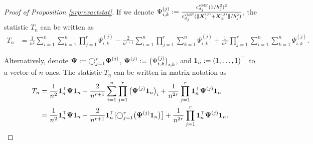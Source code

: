\documentclass[oneside,11pt]{article}
\begin{document}
\begin{proof}[Proof of Proposition \ref{prp:exactstat}]
If we denote $\Psi_{i,k}^{(j)} := \frac{c_{d_j}^\mathrm{vMF}(1/h_j^2)^2}{c_{d_j}^\mathrm{vMF}(\|\boldsymbol{X}_i^{(j)} + \boldsymbol{X}_k^{(j)}\|/h_j^2)}$, the statistic $T_n$ can be written as
\begin{align*}
    T_n &= \frac{1}{n^2} \sum_{i=1}^{n} \sum_{k=1}^{n} \prod_{j=1}^{r} \Psi_{i,k}^{(j)} - \frac{2}{n^{r+1}} \sum_{i=1}^{n} \prod_{j=1}^{r} \sum_{k=1}^{n} \Psi_{i,k}^{(j)} +  \frac{1}{n^{2r}} \prod_{j=1}^{r} \sum_{i=1}^{n} \sum_{k=1}^{n} \Psi_{i,k}^{(j)}.
\end{align*}

Alternatively, denote $\boldsymbol{\Psi} := \bigcirc_{j=1}^{r} \boldsymbol{\Psi}^{(j)}$, $\boldsymbol{\Psi}^{(j)} := \big(\Psi_{i,k}^{(j)}\big)_{i,k}$, and $\boldsymbol{1}_n := (1,\dots,1)^{\top}$ to a vector of $n$ ones. %
The statistic $T_n$ can be written in matrix notation as
\begin{align*}
    T_n &= \frac{1}{n^2} \boldsymbol{1}_n^{\top} \boldsymbol{\Psi} \boldsymbol{1}_n - \frac{2}{n^{r+1}} \sum_{i=1}^{n} \prod_{j=1}^{r} \big(\boldsymbol{\Psi}^{(j)} \boldsymbol{1}_n\big)_i + \frac{1}{n^{2r}} \prod_{j=1}^{r} \boldsymbol{1}_n^{\top} \boldsymbol{\Psi}^{(j)} \boldsymbol{1}_n\\
    &= \frac{1}{n^2} \boldsymbol{1}_n^{\top} \boldsymbol{\Psi} \boldsymbol{1}_n - \frac{2}{n^{r+1}} \boldsymbol{1}_n^\top[\bigcirc_{j=1}^{r}\big(\boldsymbol{\Psi}^{(j)} \boldsymbol{1}_n\big)\big] + \frac{1}{n^{2r}} \prod_{j=1}^{r} \boldsymbol{1}_n^{\top} \boldsymbol{\Psi}^{(j)} \boldsymbol{1}_n.
\end{align*}
\end{proof}
\end{document}
